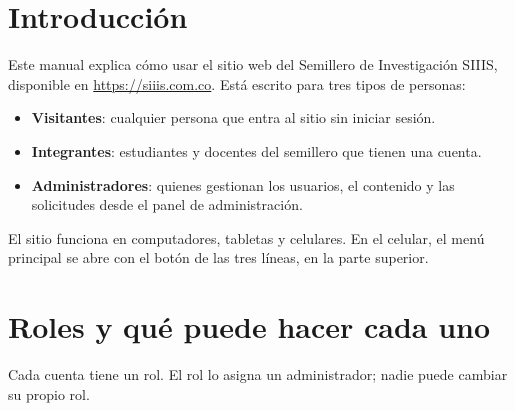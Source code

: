 \documentclass[11pt,a4paper]{article}
\begin{document}


\tableofcontents
\clearpage

\section{Introducci\'on}

Este manual explica c\'omo usar el sitio web del Semillero de Investigaci\'on SIIIS, disponible en
\url{https://siiis.com.co}. Est\'a escrito para tres tipos de personas:

\begin{itemize}
  \item \textbf{Visitantes}: cualquier persona que entra al sitio sin iniciar sesi\'on.
  \item \textbf{Integrantes}: estudiantes y docentes del semillero que tienen una cuenta.
  \item \textbf{Administradores}: quienes gestionan los usuarios, el contenido y las solicitudes desde el panel de
    administraci\'on.
\end{itemize}

El sitio funciona en computadores, tabletas y celulares. En el celular, el men\'u principal se abre con el bot\'on de
las tres l\'ineas, en la parte superior.


\section{Roles y qu\'e puede hacer cada uno}

Cada cuenta tiene un rol. El rol lo asigna un administrador; nadie puede cambiar su propio rol.
\end{document}
